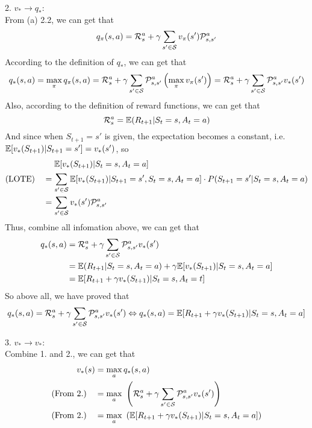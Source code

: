 \begin{homeworkProblem}
2. $v_*\to q_*$: \\
From (a) 2.2, we can get that
$$q_{\pi}(s,a) = \mathcal{R}_s^a + \gamma \sum_{s' \in \mathcal{S}} v_{\pi}(s')\mathcal{P}_{s,s'}^a$$
According to the definition of $q_*$, we can get that
$$q_{*}(s,a) = \max_{\pi} q_{\pi}(s,a) = \mathcal{R}_s^a +\gamma \sum_{s' \in \mathcal{S}} \mathcal{P}_{s,s'}^a\left(\max_{\pi}v_{\pi}(s')\right) = \mathcal{R}_s^a + \gamma \sum_{s' \in \mathcal{S}} \mathcal{P}_{s,s'}^av_*(s')$$
Also, according to the definition of reward functions, we can get that
$$\mathcal{R}_s^a=\mathbb{E}(R_{t+1}|S_t=s, A_t=a)$$
And since when $S_{t+1}=s'$ is given, the expectation becomes a constant, i.e. $\mathbb{E}[v_*(S_{t+1})|S_{t+1}=s']=v_*(s')$, so
\begin{align*}
&\quad\ \mathbb{E}[v_*(S_{t+1})|S_t=s, A_t=a] \\
\text{(LOTE)}\quad &= \sum_{s' \in \mathcal{S}} \mathbb{E}[v_*(S_{t+1}) |S_{t+1} = s', S_t = s, A_t = a]\cdot P(S_{t+1} = s'| S_t = s, A_t = a) \\
&= \sum_{s' \in \mathcal{S}} v_*(s') \mathcal{P}_{s,s'}^a
\end{align*}
Thus, combine all infomation above, we can get that
\begin{align*}
q_*(s,a) &= \mathcal{R}_s^a + \gamma \sum_{s' \in \mathcal{S}} \mathcal{P}_{s,s'}^av_*(s') \\
&= \mathbb{E}(R_{t+1}|S_t=s, A_t=a) + \gamma\mathbb{E}[v_*(S_{t+1})|S_t=s, A_t=a] \\
&= \mathbb{E}[R_{t+1} + \gamma v_*(S_{t+1})|S_t=s, A_t=t]
\end{align*}
So above all, we have proved that
$$q_{*}(s,a) = \mathcal{R}_s^a + \gamma \sum_{s' \in \mathcal{S}} \mathcal{P}_{s,s'}^av_*(s') \Leftrightarrow q_*(s,a) = \mathbb{E}[R_{t+1}+\gamma v_*(S_{t+1})|S_t=s,A_t=a]$$

3. $v_*\to v_*$: \\
Combine 1. and 2., we can get that
\begin{align*}
v_*(s) &= \max_{a} q_*(s,a) \\
\text{(From 2.)}\quad &= \max_{a}\ \left(\mathcal{R}_s^a + \gamma \sum_{s' \in \mathcal{S}} \mathcal{P}_{s,s'}^av_*(s')\right) \\
\text{(From 2.)}\quad &= \max_{a}\ \left(\mathbb{E}[R_{t+1}+\gamma v_*(S_{t+1})|S_t=s,A_t=a]\right)
\end{align*}


\end{homeworkProblem}
